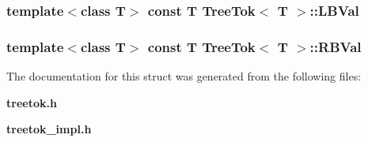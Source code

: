 \subsubsection{\setlength{\rightskip}{0pt plus 5cm}template$<$class T$>$ const T {\bf Tree\-Tok}$<$ T $>$::{\bf LBVal}\hspace{0.3cm}{\tt  [static]}}\label{structTreeTok_s0}


\subsubsection{\setlength{\rightskip}{0pt plus 5cm}template$<$class T$>$ const T {\bf Tree\-Tok}$<$ T $>$::{\bf RBVal}\hspace{0.3cm}{\tt  [static]}}\label{structTreeTok_s1}




The documentation for this struct was generated from the following files:\begin{CompactItemize}
\item 
{\bf treetok.h}\item 
{\bf treetok\_\-impl.h}\end{CompactItemize}
